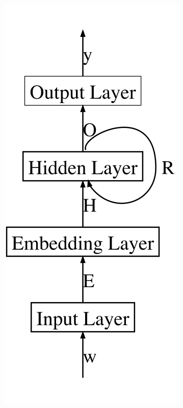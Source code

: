\documentclass[citation\_needed]{subfiles}
\begin{document}
\begin{figure}[ht!]
    \begin{minipage}{0.325\linewidth}
    \centering
    \includegraphics[scale=0.4]{images/NN/LD-RNN/ElmanRNN_inkscape}
    \end{minipage}
    \begin{minipage}{0.325\linewidth}
    \centering

\end{minipage}
\end{figure}
\end{document}
